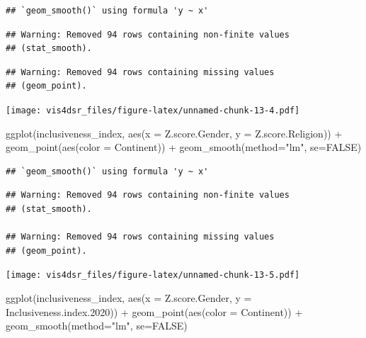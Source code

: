 \documentclass[
]{krantz}
\makeatletter
\newenvironment{Shaded}{\begin{snugshade}}{\end{snugshade}}
\newcommand{\AttributeTok}[1]{\textcolor[rgb]{0.61,0.61,0.61}{#1}}
\newcommand{\ConstantTok}[1]{\textcolor[rgb]{0,0,0}{#1}}
\newcommand{\FloatTok}[1]{\textcolor[rgb]{0.06,0.06,0.06}{#1}}
\newcommand{\FunctionTok}[1]{\textcolor[rgb]{0,0,0}{#1}}
\newcommand{\NormalTok}[1]{#1}
\newcommand{\SpecialCharTok}[1]{\textcolor[rgb]{0,0,0}{#1}}
\newcommand{\StringTok}[1]{\textcolor[rgb]{0.5,0.5,0.5}{#1}}
\newenvironment{kframe}{%
\medskip{}
\setlength{\fboxsep}{.8em}
 \def\at@end@of@kframe{}%
 \ifinner\ifhmode%
  \def\at@end@of@kframe{\end{minipage}}%
  \begin{minipage}{\columnwidth}%
 \fi\fi%
 \def\FrameCommand##1{\hskip\@totalleftmargin \hskip-\fboxsep
 \colorbox{shadecolor}{##1}\hskip-\fboxsep
     \hskip-\linewidth \hskip-\@totalleftmargin \hskip\columnwidth}%
 \MakeFramed {\advance\hsize-\width
   \@totalleftmargin\z@ \linewidth\hsize
   \@setminipage}}%
 {\par\unskip\endMakeFramed%
 \at@end@of@kframe}
\renewenvironment{Shaded}{\begin{kframe}}{\end{kframe}}
\makeatother
\begin{document}
\begin{verbatim}
## `geom_smooth()` using formula 'y ~ x'
\end{verbatim}

\begin{verbatim}
## Warning: Removed 94 rows containing non-finite values
## (stat_smooth).
\end{verbatim}

\begin{verbatim}
## Warning: Removed 94 rows containing missing values
## (geom_point).
\end{verbatim}

\texttt{[image: vis4dsr\_files/figure-latex/unnamed-chunk-13-4.pdf]}

\begin{Shaded}
\begin{Highlighting}[]
\FunctionTok{ggplot}\NormalTok{(inclusiveness\_index, }
       \FunctionTok{aes}\NormalTok{(}\AttributeTok{x =}\NormalTok{ Z.score.Gender, }
           \AttributeTok{y =}\NormalTok{ Z.score.Religion)) }\SpecialCharTok{+}
  \FunctionTok{geom\_point}\NormalTok{(}\FunctionTok{aes}\NormalTok{(}\AttributeTok{color =}\NormalTok{ Continent)) }\SpecialCharTok{+}
  \FunctionTok{geom\_smooth}\NormalTok{(}\AttributeTok{method=}\StringTok{"lm"}\NormalTok{, }\AttributeTok{se=}\ConstantTok{FALSE}\NormalTok{)}
\end{Highlighting}
\end{Shaded}

\begin{verbatim}
## `geom_smooth()` using formula 'y ~ x'
\end{verbatim}

\begin{verbatim}
## Warning: Removed 94 rows containing non-finite values
## (stat_smooth).

## Warning: Removed 94 rows containing missing values
## (geom_point).
\end{verbatim}

\texttt{[image: vis4dsr\_files/figure-latex/unnamed-chunk-13-5.pdf]}

\begin{Shaded}
\begin{Highlighting}[]
\FunctionTok{ggplot}\NormalTok{(inclusiveness\_index, }
       \FunctionTok{aes}\NormalTok{(}\AttributeTok{x =}\NormalTok{ Z.score.Gender, }
           \AttributeTok{y =}\NormalTok{ Inclusiveness.index}\FloatTok{.2020}\NormalTok{)) }\SpecialCharTok{+}
  \FunctionTok{geom\_point}\NormalTok{(}\FunctionTok{aes}\NormalTok{(}\AttributeTok{color =}\NormalTok{ Continent)) }\SpecialCharTok{+}
  \FunctionTok{geom\_smooth}\NormalTok{(}\AttributeTok{method=}\StringTok{"lm"}\NormalTok{, }\AttributeTok{se=}\ConstantTok{FALSE}\NormalTok{)}
\end{Highlighting}
\end{Shaded}
\end{document}
